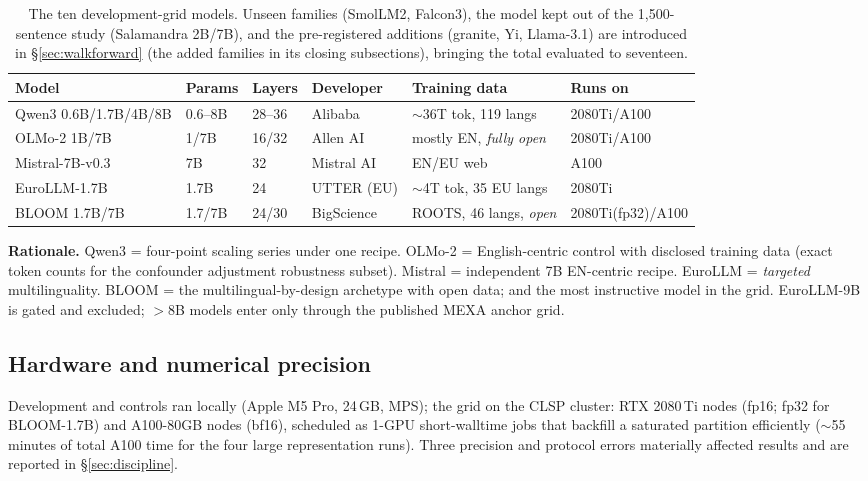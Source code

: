 \documentclass[11pt,a4paper]{article}
\begin{document}
\begin{table}[H]
\centering
\small
\caption{The ten development-grid models. Unseen families (SmolLM2, Falcon3), the model kept out of the 1,500-sentence study (Salamandra 2B/7B), and the pre-registered additions (granite, Yi, Llama-3.1) are introduced in \S\ref{sec:walkforward} (the added families in its closing subsections), bringing the total evaluated to seventeen.}
\begin{tabular}{llllll}
\toprule
Model & Params & Layers & Developer & Training data & Runs on \\
\midrule
Qwen3 0.6B/1.7B/4B/8B & 0.6--8B & 28--36 & Alibaba & $\sim$36T tok, 119 langs & 2080Ti/A100 \\
OLMo-2 1B/7B & 1/7B & 16/32 & Allen AI & mostly EN, \emph{fully open} & 2080Ti/A100 \\
Mistral-7B-v0.3 & 7B & 32 & Mistral AI & EN/EU web & A100 \\
EuroLLM-1.7B & 1.7B & 24 & UTTER (EU) & $\sim$4T tok, 35 EU langs & 2080Ti \\
BLOOM 1.7B/7B & 1.7/7B & 24/30 & BigScience & ROOTS, 46 langs, \emph{open} & 2080Ti(fp32)/A100 \\
\bottomrule
\end{tabular}
\label{tab:models}
\end{table}

\textbf{Rationale.} Qwen3 = four-point scaling series under one recipe.
OLMo-2 = English-centric control with disclosed training data (exact token
counts for the confounder adjustment robustness subset). Mistral = independent 7B
EN-centric recipe. EuroLLM = \emph{targeted} multilinguality. BLOOM =
the multilingual-by-design archetype with open data; and the most
instructive model in the grid. EuroLLM-9B is gated and excluded;
$>$8B models enter only through the published MEXA anchor grid.

\subsection{Hardware and numerical precision}
Development and controls ran locally (Apple M5 Pro, 24\,GB, MPS); the grid on
the CLSP cluster: RTX 2080\,Ti nodes (fp16; fp32 for BLOOM-1.7B) and A100-80GB
nodes (bf16), scheduled as 1-GPU short-walltime jobs that backfill a saturated
partition efficiently ($\sim$55 minutes of total A100 time for the four large
representation runs). Three precision and protocol errors materially affected
results and are reported in \S\ref{sec:discipline}.
\end{document}
